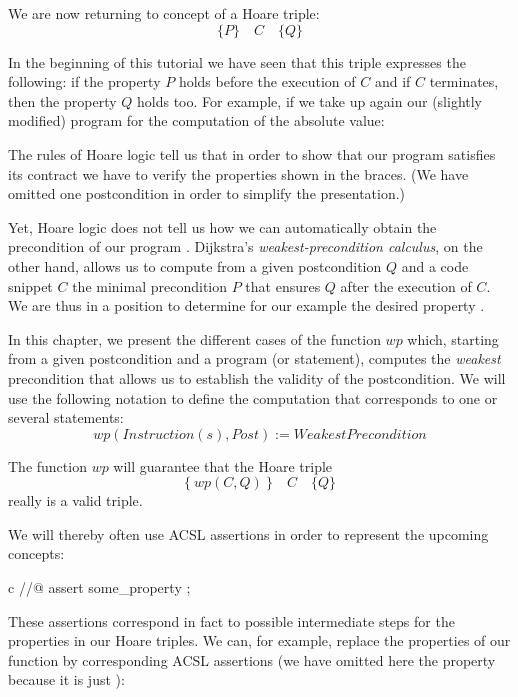 

We are now returning to concept of a Hoare triple:
$$\{ P \}\quad  C\quad \{ Q \}$$


In the beginning of this tutorial we have seen that this triple
expresses the following: if the property $P$ holds before the
execution of $C$ and if $C$ terminates, then the property $Q$
holds too. For example, if we take up again our (slightly modified)
program for the computation of the absolute value:






The rules of Hoare logic tell us that in order to show that our program
satisfies its contract we have to verify the properties shown in the
braces. (We have omitted one postcondition in order to simplify the
presentation.)






Yet, Hoare logic does not tell us how we can automatically obtain the
precondition  of our program . Dijkstra's
\emph{weakest-precondition calculus}, on the other hand, allows us to
compute from a given postcondition $Q$ and a code snippet $C$ the
minimal precondition $P$ that ensures $Q$ after the execution of
$C$. We are thus in a position to determine for our example
 the desired property .




In this chapter, we present the different cases of the function $wp$
which, starting from a given postcondition and a program (or statement),
computes the \emph{weakest} precondition that allows us to establish the
validity of the postcondition. We will use the following notation to
define the computation that corresponds to one or several statements:
$$wp(Instruction(s), Post) := WeakestPrecondition$$



The function \(wp\) will guarantee that the Hoare triple
$$\{\ wp(C,Q)\ \}\quad C\quad \{ Q \}$$
really is a valid triple.



We will thereby often use ACSL assertions in order to represent the
upcoming concepts:



\begin{CodeBlock}{c}
//@ assert some_property ;
\end{CodeBlock}



These assertions correspond in fact to possible intermediate steps for
the properties in our Hoare triples. We can, for example, replace the
properties of our function  by corresponding ACSL assertions
(we have omitted here the property  because it is just
):



